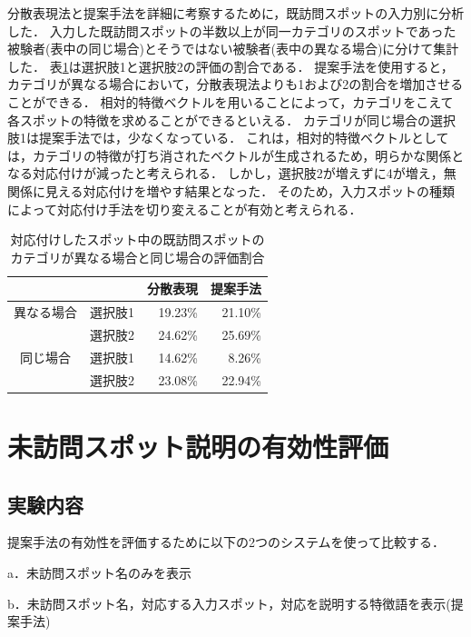 \documentclass[submit]{ipsj}
\begin{document}
分散表現法と提案手法を詳細に考察するために，既訪問スポットの入力別に分析した．
入力した既訪問スポットの半数以上が同一カテゴリのスポットであった被験者(表中の同じ場合)とそうではない被験者(表中の異なる場合)に分けて集計した．
表\ref{table:対応付けしたスポット中}は選択肢1と選択肢2の評価の割合である．
提案手法を使用すると，カテゴリが異なる場合において，分散表現法よりも1および2の割合を増加させることができる．
相対的特徴ベクトルを用いることによって，カテゴリをこえて各スポットの特徴を求めることができるといえる．
カテゴリが同じ場合の選択肢1は提案手法では，少なくなっている．
これは，相対的特徴ベクトルとしては，カテゴリの特徴が打ち消されたベクトルが生成されるため，明らかな関係となる対応付けが減ったと考えられる．
しかし，選択肢2が増えずに4が増え，無関係に見える対応付けを増やす結果となった．
そのため，入力スポットの種類によって対応付け手法を切り変えることが有効と考えられる．

\begin{table}[t]
  \caption{対応付けしたスポット中の既訪問スポットのカテゴリが異なる場合と同じ場合の評価割合}
  \label{table:対応付けしたスポット中}
  \centering
  \begin{tabular}{c|c|r|r}
  \hline
  &     & \multicolumn{1}{c|}{分散表現} & \multicolumn{1}{c}{提案手法} \\ \hline
  異なる場合                 & 選択肢1 & 19.23\%                  & 21.10\%                 \\ \cline{2-4}
  & 選択肢2 & 24.62\%                  & 25.69\%                 \\ \hline
  同じ場合                  & 選択肢1 & 14.62\%                  & 8.26\%                  \\ \cline{2-4}
  \multicolumn{1}{l|}{} & 選択肢2 & 23.08\%                  & 22.94\%                 \\ \hline
  \end{tabular}
\end{table}

\section{未訪問スポット説明の有効性評価}
\label{sec:未訪問スポット説明の有効性評価}
\subsection{実験内容}
提案手法の有効性を評価するために以下の2つのシステムを使って比較する．
\begin{description}
  \item a．未訪問スポット名のみを表示
  \item b．未訪問スポット名，対応する入力スポット，対応を説明する特徴語を表示(提案手法)
\end{description}
\end{document}
